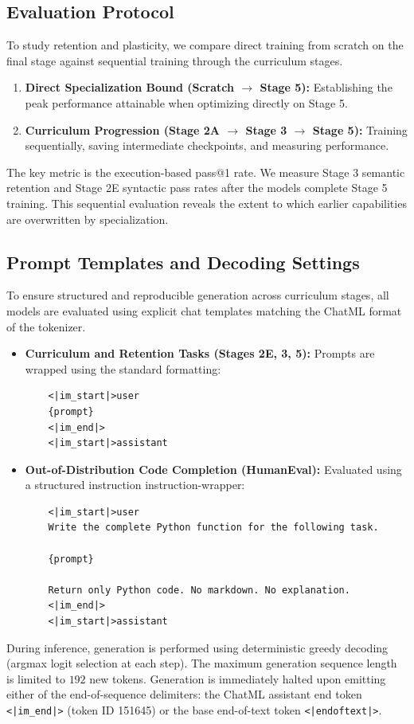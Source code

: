 \documentclass[11pt,a4paper]{article}
\begin{document}
\subsection{Evaluation Protocol}
To study retention and plasticity, we compare direct training from scratch on the final stage against sequential training through the curriculum stages.
\begin{enumerate}
    \item \textbf{Direct Specialization Bound (Scratch $\rightarrow$ Stage 5):} Establishing the peak performance attainable when optimizing directly on Stage 5.
    \item \textbf{Curriculum Progression (Stage 2A $\rightarrow$ Stage 3 $\rightarrow$ Stage 5):} Training sequentially, saving intermediate checkpoints, and measuring performance.
\end{enumerate}
The key metric is the execution-based pass@1 rate. We measure Stage 3 semantic retention and Stage 2E syntactic pass rates after the models complete Stage 5 training. This sequential evaluation reveals the extent to which earlier capabilities are overwritten by specialization.

\subsection{Prompt Templates and Decoding Settings}
To ensure structured and reproducible generation across curriculum stages, all models are evaluated using explicit chat templates matching the ChatML format of the tokenizer.
\begin{itemize}
    \item \textbf{Curriculum and Retention Tasks (Stages 2E, 3, 5):} Prompts are wrapped using the standard formatting:
    \begin{verbatim}
    <|im_start|>user
    {prompt}
    <|im_end|>
    <|im_start|>assistant
    \end{verbatim}
    \item \textbf{Out-of-Distribution Code Completion (HumanEval):} Evaluated using a structured instruction instruction-wrapper:
    \begin{verbatim}
    <|im_start|>user
    Write the complete Python function for the following task.

    {prompt}

    Return only Python code. No markdown. No explanation.
    <|im_end|>
    <|im_start|>assistant
    \end{verbatim}
\end{itemize}
During inference, generation is performed using deterministic greedy decoding (argmax logit selection at each step). The maximum generation sequence length is limited to $192$ new tokens. Generation is immediately halted upon emitting either of the end-of-sequence delimiters: the ChatML assistant end token \texttt{\textless|im\_end|\textgreater} (token ID 151645) or the base end-of-text token \texttt{\textless|endoftext|\textgreater}.
\end{document}
